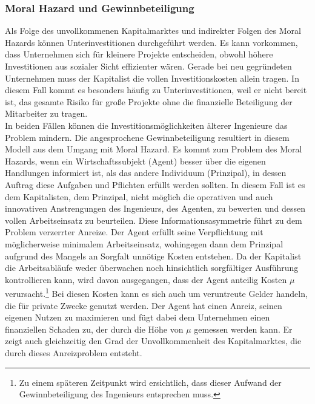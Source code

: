 \subsubsection{Moral Hazard und Gewinnbeteiligung}\label{Moral Hazard und Gewinnbeteiligung}


Als Folge des unvollkommenen Kapitalmarktes und indirekter Folgen des Moral Hazards können Unterinvestitionen durchgeführt werden. Es kann vorkommen, dass Unternehmen sich für kleinere Projekte entscheiden, obwohl höhere Investitionen aus sozialer Sicht effizienter wären. Gerade bei neu gegründeten Unternehmen muss der Kapitalist die vollen Investitionskosten allein tragen. In diesem Fall kommt es besonders häufig zu Unterinvestitionen, weil er nicht bereit ist, das gesamte Risiko für gro{\ss}e Projekte ohne die finanzielle Beteiligung der Mitarbeiter zu tragen.\\


In beiden Fällen können die Investitionsmöglichkeiten älterer Ingenieure das Problem mindern. Die angesprochene Gewinnbeteiligung resultiert in diesem Modell aus dem Umgang mit Moral Hazard. Es kommt zum Problem des Moral Hazards, wenn ein Wirtschaftssubjekt (Agent) besser über die eigenen Handlungen informiert ist, als das andere Individuum (Prinzipal), in dessen Auftrag diese Aufgaben und Pflichten erfüllt werden sollten. In diesem Fall ist es dem Kapitalisten, dem Prinzipal, nicht möglich die operativen und auch innovativen Anstrengungen des Ingenieurs, des Agenten,  zu bewerten und dessen vollen Arbeitseinsatz zu beurteilen. Diese Informationsasymmetrie führt zu dem Problem verzerrter Anreize. Der Agent erfüllt seine Verpflichtung mit möglicherweise minimalem Arbeitseinsatz, wohingegen dann dem Prinzipal aufgrund des Mangels an Sorgfalt unnötige Kosten entstehen. Da der Kapitalist die Arbeitsabläufe weder überwachen noch hinsichtlich sorgfältiger Ausführung kontrollieren kann, wird davon ausgegangen, dass der Agent anteilig Kosten $\mu$ verursacht.\footnote{Zu einem späteren Zeitpunkt wird ersichtlich, dass dieser Aufwand der Gewinnbeteiligung des Ingenieurs entsprechen muss.} Bei diesen Kosten kann es sich auch um veruntreute Gelder handeln, die für private Zwecke genutzt werden. Der Agent hat einen Anreiz, seinen eigenen Nutzen zu maximieren und fügt dabei dem Unternehmen einen finanziellen Schaden zu, der durch die Höhe von $\mu$ gemessen werden kann. Er zeigt auch gleichzeitig den Grad der Unvollkommenheit des Kapitalmarktes, die durch dieses Anreizproblem entsteht.\\ 


